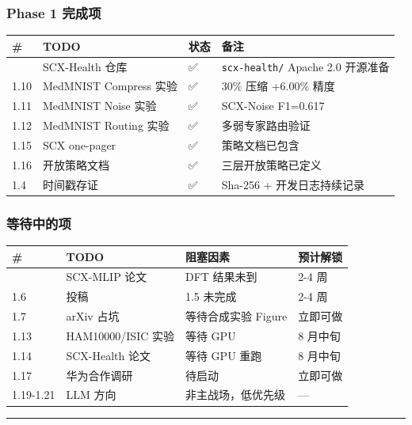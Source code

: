 \documentclass[
  12pt,
]{ctexart}
\begin{document}
\subsubsection{Phase 1 完成项}\label{phase-1-ux5b8cux6210ux9879}

\begin{longtable}[]{@{}llll@{}}
\toprule\noalign{}
\# & TODO & 状态 & 备注 \\
\midrule\noalign{}
\endhead
\bottomrule\noalign{}
\endlastfoot
1.9 & SCX-Health 仓库 & ✅ & \texttt{scx-health/} Apache 2.0 开源准备 \\
1.10 & MedMNIST Compress 实验 & ✅ & 30\% 压缩 +6.00\% 精度 \\
1.11 & MedMNIST Noise 实验 & ✅ & SCX-Noise F1=0.617 \\
1.12 & MedMNIST Routing 实验 & ✅ & 多弱专家路由验证 \\
1.15 & SCX one-pager & ✅ & 策略文档已包含 \\
1.16 & 开放策略文档 & ✅ & 三层开放策略已定义 \\
1.4 & 时间戳存证 & ✅ & Sha-256 + 开发日志持续记录 \\
\end{longtable}

\subsubsection{等待中的项}\label{ux7b49ux5f85ux4e2dux7684ux9879}

\begin{longtable}[]{@{}llll@{}}
\toprule\noalign{}
\# & TODO & 阻塞因素 & 预计解锁 \\
\midrule\noalign{}
\endhead
\bottomrule\noalign{}
\endlastfoot
1.5 & SCX-MLIP 论文 & DFT 结果未到 & 2-4 周 \\
1.6 & 投稿 & 1.5 未完成 & 2-4 周 \\
1.7 & arXiv 占坑 & 等待合成实验 Figure & 立即可做 \\
1.13 & HAM10000/ISIC 实验 & 等待 GPU & 8 月中旬 \\
1.14 & SCX-Health 论文 & 等待 GPU 重跑 & 8 月中旬 \\
1.17 & 华为合作调研 & 待启动 & 立即可做 \\
1.19-1.21 & LLM 方向 & 非主战场，低优先级 & --- \\
\end{longtable}

\begin{center}\rule{0.5\linewidth}{0.5pt}\end{center}
\end{document}
